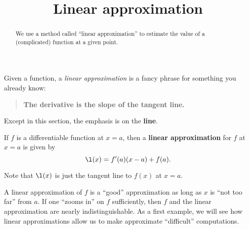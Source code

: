 \documentclass{ximera}
\title[Dig-In:]{Linear approximation}
\begin{document}
\begin{abstract}
We use a method called ``linear approximation'' to estimate the value
of a (complicated) function at a given point.
\end{abstract}
\maketitle


Given a function, a \textit{linear approximation} is a fancy phrase
for something you already know:
\begin{quote}
  \textbf{The derivative is the slope of the tangent line.}
\end{quote}
Except in this section, the emphasis is on the \textbf{line}.

\begin{definition}
If $f$ is a differentiable function at $x=a$, then a \textbf{linear
  approximation} for $f$ at $x=a$ is given by
\[
\l(x) = f'(a)(x-a) +f(a).
\]
\end{definition}


Note that $\l(x)$ is just the tangent line to $f(x)$ at $x=a$.

A linear approximation of $f$ is a ``good'' approximation as long as
$x$ is ``not too far'' from $a$.
If one ``zooms in'' on $f$ sufficiently, then $f$ and the linear
approximation are nearly indistinguishable. As a first example, we
will see how linear approximations allow us to make approximate
``difficult'' computations.
\end{document}
